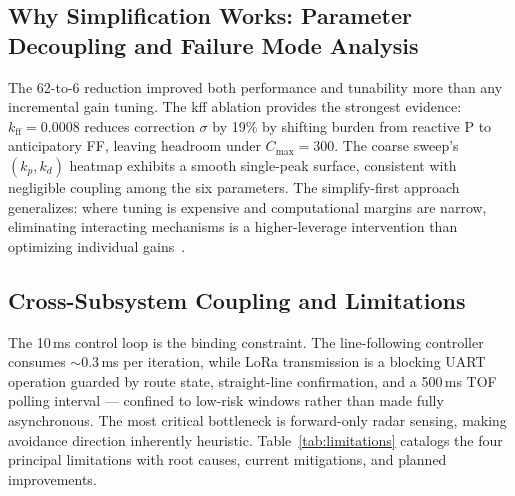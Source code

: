 \documentclass[letterpaper,journal]{IEEEtran}
\begin{document}
\subsection{Why Simplification Works: Parameter Decoupling and Failure Mode Analysis}

The 62-to-6 reduction improved both performance and tunability more than any incremental gain tuning. The kff ablation provides the strongest evidence: $k_{\text{ff}}=0.0008$ reduces correction $\sigma$ by 19\% by shifting burden from reactive P to anticipatory FF, leaving headroom under $C_{\text{max}}=300$. The coarse sweep's $(k_p, k_d)$ heatmap exhibits a smooth single-peak surface, consistent with negligible coupling among the six parameters. The simplify-first approach generalizes: where tuning is expensive and computational margins are narrow, eliminating interacting mechanisms is a higher-leverage intervention than optimizing individual gains~\cite{skogestad2003simple}.

\subsection{Cross-Subsystem Coupling and Limitations}

The 10\,ms control loop is the binding constraint. The line-following controller consumes $\sim$0.3\,ms per iteration, while LoRa transmission is a blocking UART operation guarded by route state, straight-line confirmation, and a 500\,ms TOF polling interval --- confined to low-risk windows rather than made fully asynchronous. The most critical bottleneck is forward-only radar sensing, making avoidance direction inherently heuristic. Table~\ref{tab:limitations} catalogs the four principal limitations with root causes, current mitigations, and planned improvements.
\end{document}
